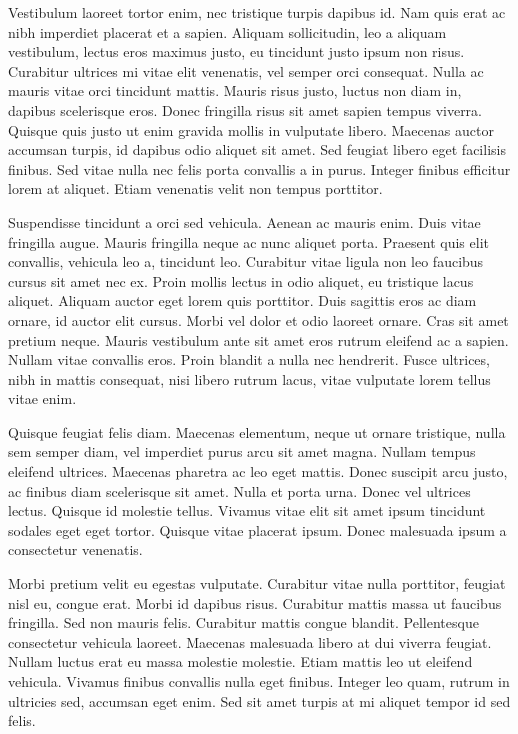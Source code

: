 Vestibulum laoreet tortor enim, nec tristique turpis dapibus id. Nam quis erat ac nibh imperdiet placerat et a sapien. Aliquam sollicitudin, leo a aliquam vestibulum, lectus eros maximus justo, eu tincidunt justo ipsum non risus. Curabitur ultrices mi vitae elit venenatis, vel semper orci consequat. Nulla ac mauris vitae orci tincidunt mattis. Mauris risus justo, luctus non diam in, dapibus scelerisque eros. Donec fringilla risus sit amet sapien tempus viverra. Quisque quis justo ut enim gravida mollis in vulputate libero. Maecenas auctor accumsan turpis, id dapibus odio aliquet sit amet. Sed feugiat libero eget facilisis finibus. Sed vitae nulla nec felis porta convallis a in purus. Integer finibus efficitur lorem at aliquet. Etiam venenatis velit non tempus porttitor.

Suspendisse tincidunt a orci sed vehicula. Aenean ac mauris enim. Duis vitae fringilla augue. Mauris fringilla neque ac nunc aliquet porta. Praesent quis elit convallis, vehicula leo a, tincidunt leo. Curabitur vitae ligula non leo faucibus cursus sit amet nec ex. Proin mollis lectus in odio aliquet, eu tristique lacus aliquet. Aliquam auctor eget lorem quis porttitor. Duis sagittis eros ac diam ornare, id auctor elit cursus. Morbi vel dolor et odio laoreet ornare. Cras sit amet pretium neque. Mauris vestibulum ante sit amet eros rutrum eleifend ac a sapien. Nullam vitae convallis eros. Proin blandit a nulla nec hendrerit. Fusce ultrices, nibh in mattis consequat, nisi libero rutrum lacus, vitae vulputate lorem tellus vitae enim.

Quisque feugiat felis diam. Maecenas elementum, neque ut ornare tristique, nulla sem semper diam, vel imperdiet purus arcu sit amet magna. Nullam tempus eleifend ultrices. Maecenas pharetra ac leo eget mattis. Donec suscipit arcu justo, ac finibus diam scelerisque sit amet. Nulla et porta urna. Donec vel ultrices lectus. Quisque id molestie tellus. Vivamus vitae elit sit amet ipsum tincidunt sodales eget eget tortor. Quisque vitae placerat ipsum. Donec malesuada ipsum a consectetur venenatis.

Morbi pretium velit eu egestas vulputate. Curabitur vitae nulla porttitor, feugiat nisl eu, congue erat. Morbi id dapibus risus. Curabitur mattis massa ut faucibus fringilla. Sed non mauris felis. Curabitur mattis congue blandit. Pellentesque consectetur vehicula laoreet. Maecenas malesuada libero at dui viverra feugiat. Nullam luctus erat eu massa molestie molestie. Etiam mattis leo ut eleifend vehicula. Vivamus finibus convallis nulla eget finibus. Integer leo quam, rutrum in ultricies sed, accumsan eget enim. Sed sit amet turpis at mi aliquet tempor id sed felis.

